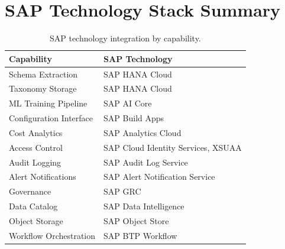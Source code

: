 \section{SAP Technology Stack Summary}

\begin{table}[htbp]
\centering
\caption{SAP technology integration by capability.}
\label{tab:sap-stack}
\footnotesize
\begin{tabularx}{\textwidth}{@{}l X@{}}
\toprule
\textbf{Capability} & \textbf{SAP Technology} \\
\midrule
Schema Extraction & SAP HANA Cloud \\
Taxonomy Storage & SAP HANA Cloud \\
ML Training Pipeline & SAP AI Core \\
Configuration Interface & SAP Build Apps \\
Cost Analytics & SAP Analytics Cloud \\
Access Control & SAP Cloud Identity Services, XSUAA \\
Audit Logging & SAP Audit Log Service \\
Alert Notifications & SAP Alert Notification Service \\
Governance & SAP GRC \\
Data Catalog & SAP Data Intelligence \\
Object Storage & SAP Object Store \\
Workflow Orchestration & SAP BTP Workflow \\
\bottomrule
\end{tabularx}
\end{table}